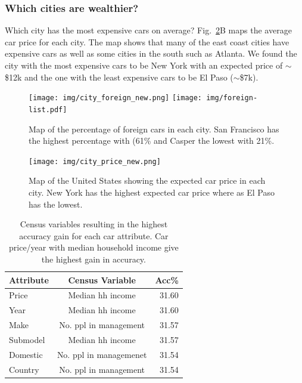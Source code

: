 \documentclass[10pt,twocolumn,letterpaper]{article}
\begin{document}
\subsubsection{Which cities are wealthier?}
Which city has the most expensive cars on average? Fig.~\ref{fig:city_price}B maps the average car price for each city. The map shows that many of the east coast cities have expensive cars as well as some cities in the south such as Atlanta. We found the city with the most expensive cars to be New York with an expected price of \(\sim\)\$12k and the one with the least expensive cars to be El Paso (\(\sim\)\$7k). 

\begin{figure}[t]
\begin{center}
    \texttt{[image: img/city\_foreign\_new.png]}
    \texttt{[image: img/foreign-list.pdf]}
\end{center}
   \caption {Map of the percentage of foreign cars in each city. San Francisco has the highest percentage with (61\% and Casper the lowest with 21\%.} 
\label{fig:city_price}
\end{figure}

\begin{figure}[t]
\begin{center}
    \texttt{[image: img/city\_price\_new.png]}
\end{center}
   \caption {Map of the United States showing the expected car price in each city. New York has the highest expected car price where as El Paso has the lowest.}
\label{fig:city_price}
\end{figure}

\begin{table}
\begin{center}
\begin{tabular}{|l|c|r|}
\hline
\textbf{Attribute} & \textbf{Census Variable}& \textbf{Acc\%}\\
\hline\hline
Price & Median hh income & 31.60\\
Year  & Median hh income & 31.60\\
Make & No. ppl in management & 31.57\\
Submodel & Median hh income & 31.57\\
Domestic & No. ppl in managemenet & 31.54\\
Country & No. ppl in management & 31.54\\
\hline
\end{tabular}
\end{center}
\caption{Census variables resulting in the highest accuracy gain for each car attribute. Car price/year with median household income give the highest gain in accuracy.}
\label{table:prior-acc}
\end{table}
\end{document}
